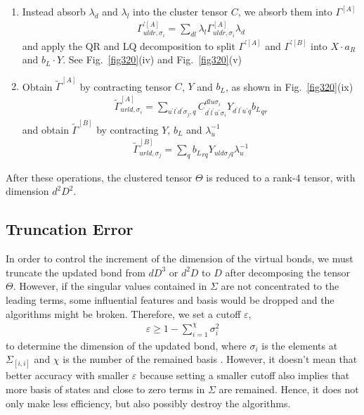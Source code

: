 \begin{enumerate}
	\item Instead absorb $\lambda_d$ and $\lambda_l$ into the cluster tensor $C$, we absorb them into $\Gamma^{[A]}$
		\begin{align}
			\Gamma^{\prime [A]}_{uldr,\sigma_i} = \sum_{dl}{\lambda_l \Gamma^{[A]}_{uldr,\sigma_i} \lambda_d}
		\end{align}
		and apply the QR and LQ decomposition to split $\Gamma^{\prime [A]}$ and $\Gamma^{\prime [B]}$ into $X\cdot a_R$ and $b_L \cdot Y$. See Fig.~\ref{fig320}(iv) and Fig.~\ref{fig320}(v) 
	\item Obtain $\widetilde{\Gamma}^{[A]}$ by contracting tensor $C$, $Y$ and $b_L$, as shown in Fig.~\ref{fig320}(ix)
		\begin{align}
			\widetilde{\Gamma}^{[A]}_{urld, \sigma_i} = \sum_{u^{\prime}l^{\prime}d^{\prime}\sigma_j,q}{C^{dlu\sigma_i}_{d^{\prime}l^{\prime}u^{\prime}\sigma_i}Y_{d^{\prime}l^{\prime}u^{\prime}q}{b_L}_{qr}}
		\end{align}
		and obtain $\widetilde{\Gamma}^{[B]}$ by contracting $Y$, $b_L$ and $\lambda_u^{-1}$
		\begin{align}
			\widetilde{\Gamma}^{[B]}_{urld,\sigma_j} = \sum_{q}{{b_L}_{rq}Y_{uld\sigma_j q}\lambda_u^{-1}}
		\end{align}
\end{enumerate}

After these operations, the clustered tensor $\Theta$ is reduced to a rank-4 tensor, with dimension $d^2D^2$.

\subsection{Truncation Error}
In order to control the increment of the dimension of the virtual bonds, we must truncate the updated bond from $dD^3$ or $d^2D$ to $D$ after decomposing the tensor $\Theta$. However, if the singular values contained in $\Sigma$ are not concentrated to the leading terms, some influential features and basis would be dropped and the algorithms might be broken. Therefore, we set a cutoff $\varepsilon$, 
\begin{align}
	\varepsilon \geq 1 - \sum_{i=1}^{\chi}{\sigma_i^2}
\end{align}
to determine the dimension of the updated bond, where $\sigma_i$ is the elements at $\Sigma_{[i,i]}$ and $\chi$ is the number of the remained basis . However, it doesn't mean that better accuracy with smaller $\varepsilon$ because setting a smaller cutoff also implies that more basis of states and close to zero terms in $\Sigma$ are remained. Hence, it does not only make less efficiency, but also possibly destroy the algorithms.

